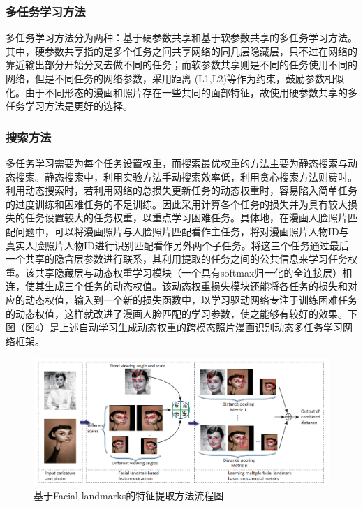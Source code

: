 \documentclass[12pt]{article}
\begin{document}
\begin{sloppypar}
\begin{multicols*}{2}
\subsubsection{多任务学习方法}多任务学习方法分为两种：基于硬参数共享和基于软参数共享的多任务学习方法。其中，硬参数共享指的是多个任务之间共享网络的同几层隐藏层，只不过在网络的靠近输出部分开始分叉去做不同的任务；而软参数共享则是不同的任务使用不同的网络，但是不同任务的网络参数，采用距离 (L1,L2)等作为约束，鼓励参数相似化。由于不同形态的漫画和照片存在一些共同的面部特征，故使用硬参数共享的多任务学习方法是更好的选择。\subsubsection{搜索方法}多任务学习需要为每个任务设置权重，而搜索最优权重的方法主要为静态搜索与动态搜索。静态搜索中，利用实验方法手动搜索效率低，利用贪心搜索方法则费时。利用动态搜索时，若利用网络的总损失更新任务的动态权重时，容易陷入简单任务的过度训练和困难任务的不足训练。因此采用计算各个任务的损失并为具有较大损失的任务设置较大的任务权重，以重点学习困难任务。具体地，在漫画人脸照片匹配问题中，可以将漫画照片与人脸照片匹配看作主任务，将对漫画照片人物ID与真实人脸照片人物ID进行识别匹配看作另外两个子任务。将这三个任务通过最后一个共享的隐含层参数进行联系，其利用提取的任务之间的公共信息来学习任务权重。该共享隐藏层与动态权重学习模块（一个具有softmax归一化的全连接层）相连，使其生成三个任务的动态权值。该动态权重损失模块还能将各任务的损失和对应的动态权值，输入到一个新的损失函数中，以学习驱动网络专注于训练困难任务的动态权值，这样就改进了漫画人脸匹配的学习参数，使之能够有较好的效果。下图（图4）是上述自动学习生成动态权重的跨模态照片漫画识别动态多任务学习网络框架。
\end{multicols*}
\begin{figure}[H]
	\centering
	\includegraphics[width=\textwidth]{sections/figs/fl.png}
	\caption{\label{fig2.11} \xiaowuhao \hei 基于Facial landmarks的特征提取方法流程图}
\end{figure}


\end{sloppypar}
\end{document}
